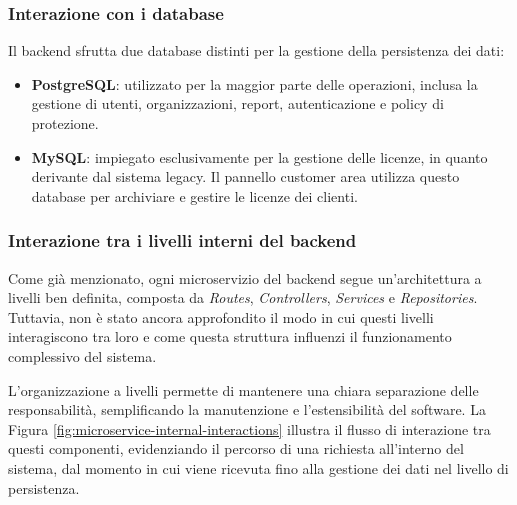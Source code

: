 \subsubsection{Interazione con i database}
Il backend sfrutta due database distinti per la gestione della persistenza dei dati:
\begin{itemize}
    \item \textbf{PostgreSQL}: utilizzato per la maggior parte delle operazioni, inclusa la gestione di utenti, organizzazioni, report, autenticazione e policy di protezione.
    \item \textbf{MySQL}: impiegato esclusivamente per la gestione delle licenze, in quanto derivante dal sistema legacy. Il pannello customer area utilizza questo database per archiviare e gestire le licenze dei clienti.
\end{itemize}

\subsubsection{Interazione tra i livelli interni del backend}
Come già menzionato, ogni microservizio del backend segue un'architettura a livelli ben definita, composta da \textit{Routes}, \textit{Controllers}, \textit{Services} e \textit{Repositories}. Tuttavia, non è stato ancora approfondito il modo in cui questi livelli interagiscono tra loro e come questa struttura influenzi il funzionamento complessivo del sistema.

L'organizzazione a livelli permette di mantenere una chiara separazione delle responsabilità, semplificando la manutenzione e l'estensibilità del software. La Figura \ref{fig:microservice-internal-interactions} illustra il flusso di interazione tra questi componenti, evidenziando il percorso di una richiesta all'interno del sistema, dal momento in cui viene ricevuta fino alla gestione dei dati nel livello di persistenza.

